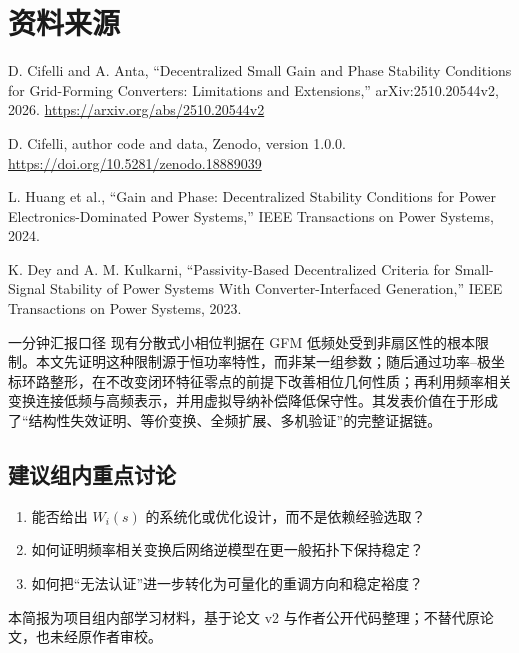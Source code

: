 \documentclass[11pt,a4paper]{ctexart}
\begin{document}
\section*{资料来源}
\begin{enumerate}[label={[\arabic*]}]
  \item D. Cifelli and A. Anta, ``Decentralized Small Gain and Phase Stability Conditions for Grid-Forming Converters: Limitations and Extensions,'' arXiv:2510.20544v2, 2026. \url{https://arxiv.org/abs/2510.20544v2}
  \item D. Cifelli, author code and data, Zenodo, version 1.0.0. \url{https://doi.org/10.5281/zenodo.18889039}
  \item L. Huang et al., ``Gain and Phase: Decentralized Stability Conditions for Power Electronics-Dominated Power Systems,'' IEEE Transactions on Power Systems, 2024.
  \item K. Dey and A. M. Kulkarni, ``Passivity-Based Decentralized Criteria for Small-Signal Stability of Power Systems With Converter-Interfaced Generation,'' IEEE Transactions on Power Systems, 2023.
\end{enumerate}

\begin{claimbox}{一分钟汇报口径}
现有分散式小相位判据在 GFM 低频处受到非扇区性的根本限制。本文先证明这种限制源于恒功率特性，而非某一组参数；随后通过功率--极坐标环路整形，在不改变闭环特征零点的前提下改善相位几何性质；再利用频率相关变换连接低频与高频表示，并用虚拟导纳补偿降低保守性。其发表价值在于形成了“结构性失效证明、等价变换、全频扩展、多机验证”的完整证据链。
\end{claimbox}

\subsection*{建议组内重点讨论}
\begin{enumerate}
  \item 能否给出 $W_i(s)$ 的系统化或优化设计，而不是依赖经验选取？
  \item 如何证明频率相关变换后网络逆模型在更一般拓扑下保持稳定？
  \item 如何把“无法认证”进一步转化为可量化的重调方向和稳定裕度？
\end{enumerate}

\vfill
\begin{center}
\footnotesize\color{darkgray}
本简报为项目组内部学习材料，基于论文 v2 与作者公开代码整理；不替代原论文，也未经原作者审校。
\end{center}
\end{document}
